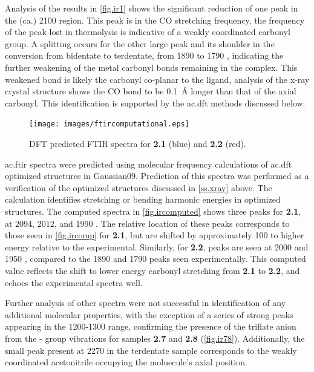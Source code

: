 Analysis of the results in \autoref{fig.ir1} shows the significant reduction of one peak in the (ca.) 2100  region. This peak is in the CO stretching frequency, the frequency of the peak lost in thermolysis is indicative of a weakly coordinated carbonyl group. A splitting occurs for the other large peak and its shoulder in the conversion from bidentate to terdentate, from 1890 to 1790 , indicating the further weakening of the metal carbonyl bonds remaining in the complex. This weakened bond is likely the carbonyl co-planar to the ligand, analysis of the x-ray crystal structure shows the CO bond to be 0.1~\r{A} longer than that of the axial carbonyl. This identification is supported by the \gls{ac.dft} methods discussed below.

\begin{figure}[!htb]
 \centering
 \texttt{[image: images/ftircomputational.eps]}
 \caption[DFT predicted FTIR spectra for \textbf{2.1} and \textbf{2.2}]{DFT predicted FTIR spectra for \textbf{2.1} (blue) and \textbf{2.2} (red).}
 \label{fig.ircomp}
\end{figure}

\Gls{ac.ftir} spectra were predicted using molecular frequency calculations of \gls{ac.dft} optimized structures in Gaussian09. Prediction of this spectra was performed as a verification of the optimized structures discussed in \autoref{ss.xray} above. The calculation identifies stretching or bending harmonic energies in optimized structures. The computed spectra in \autoref{fig.ircomputed} shows three peaks for \textbf{2.1}, at 2094, 2012, and 1990 . The relative location of these peaks corresponds to those seen in \autoref{fig.ircomp} for \textbf{2.1}, but are shifted by approximately 100  to higher energy relative to the experimental. Similarly, for \textbf{2.2}, peaks are seen at 2000 and 1950 , compared to the 1890 and 1790 peaks seen experimentally. This computed value reflects the shift to lower energy carbonyl stretching from \textbf{2.1} to \textbf{2.2}, and echoes the experimental spectra well.

Further analysis of other spectra were not successful in identification of any additional molecular properties, with the exception of a series of strong peaks appearing in the 1200-1300  range, confirming the presence of the triflate anion from the - group vibrations for samples \textbf{2.7} and \textbf{2.8} (\autoref{fig.ir78}). Additionally, the small peak present at 2270  in the terdentate sample corresponds to the weakly coordinated acetonitrile occupying the moluecule's axial position.

